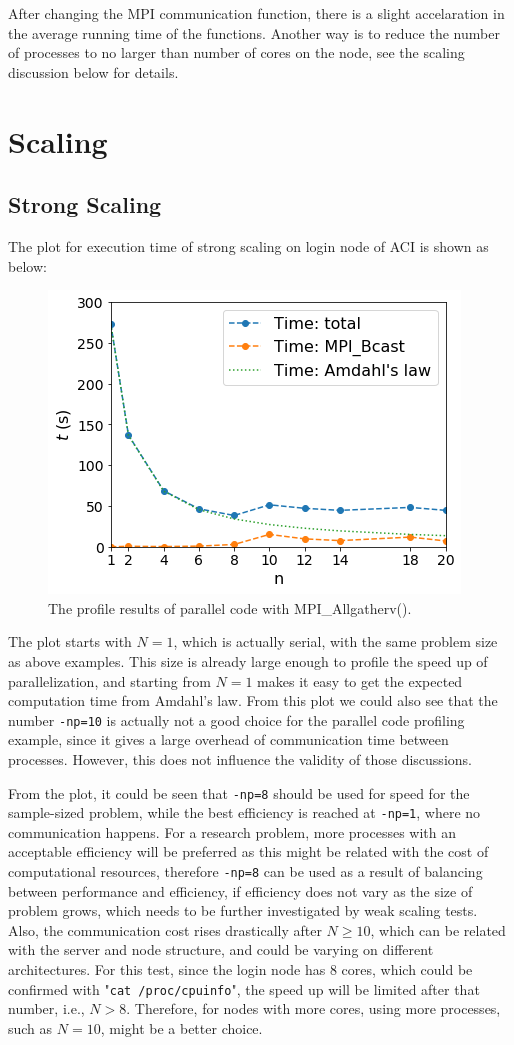 \documentclass{article}
\begin{document}
\begin{spacing}{1.1}
After changing the MPI communication function, there is a slight accelaration in the average running time of the functions. Another way is to reduce the number of processes to no larger than number of cores on the node, see the scaling discussion below for details.

\section{Scaling}

\subsection{Strong Scaling}

The plot for execution time of strong scaling on login node of ACI is shown as below:

\begin{figure}[H]
  \centering
  \includegraphics[width=0.5\linewidth]{output/scaling.png}
  \caption{The profile results of parallel code with MPI\_Allgatherv().}
  \label{fig-testcase}
\end{figure}

The plot starts with $N=1$, which is actually serial, with the same problem size as above examples. This size is already large enough to profile the speed up of parallelization, and starting from $N=1$ makes it easy to get the expected computation time from Amdahl's law. From this plot we could also see that the number \texttt{-np=10} is actually not a good choice for the parallel code profiling example, since it gives a large overhead of communication time between processes. However, this does not influence the validity of those discussions.

From the plot, it could be seen that \texttt{-np=8} should be used for speed for the sample-sized problem, while the best efficiency is reached at \texttt{-np=1}, where no communication happens. For a research problem, more processes with an acceptable efficiency will be preferred as this might be related with the cost of computational resources, therefore \texttt{-np=8} can be used as a result of balancing between performance and efficiency, if efficiency does not vary as the size of problem grows, which needs to be further investigated by weak scaling tests. Also, the communication cost rises drastically after $N \geq 10$, which can be related with the server and node structure, and could be varying on different architectures. For this test, since the login node has 8 cores, which could be confirmed with "\texttt{cat /proc/cpuinfo}", the speed up will be limited after that number, i.e., $N > 8$. Therefore, for nodes with more cores, using more processes, such as $N=10$, might be a better choice.


\end{spacing}
\end{document}
